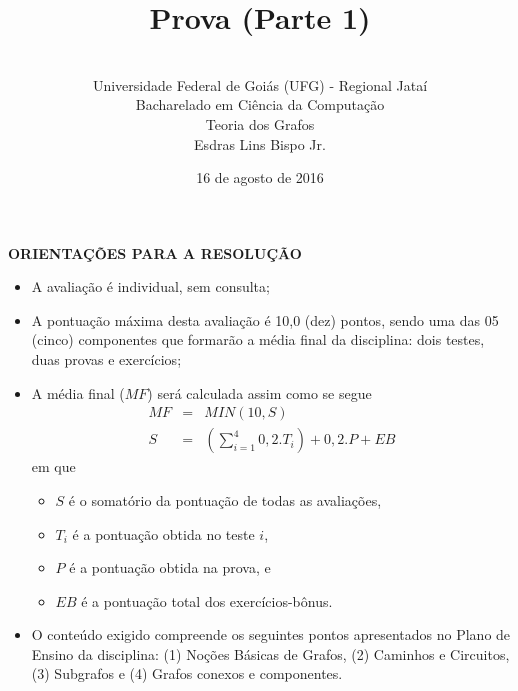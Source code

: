 \documentclass[12pt,a4paper,oneside]{article}
\author{\\Universidade Federal de Goiás (UFG) - Regional Jataí\\Bacharelado em Ciência da Computação \\Teoria dos Grafos \\Esdras Lins Bispo Jr.}
\title{\sc \huge Prova (Parte 1)}
\date{16 de agosto de 2016}
\begin{document}
\maketitle

{\bf ORIENTAÇÕES PARA A RESOLUÇÃO}

\footnotesize

\begin{itemize}
	\item A avaliação é individual, sem consulta;
	\item A pontuação máxima desta avaliação é 10,0 (dez) pontos, sendo uma das 05 (cinco) componentes que formarão a média final da disciplina: dois testes, duas provas e exercícios;
	\item A média final ($MF$) será calculada assim como se segue
	\begin{eqnarray}
		MF & = & MIN(10, S) \nonumber \\
		S & = & (\sum_{i=1}^{4} 0,2.T_i ) + 0,2.P  + EB \nonumber
	\end{eqnarray}
	em que 
	\begin{itemize}
		\item $S$ é o somatório da pontuação de todas as avaliações,
		\item $T_i$ é a pontuação obtida no teste $i$,
		\item $P$ é a pontuação obtida na prova, e
		\item $EB$ é a pontuação total dos exercícios-bônus.
	\end{itemize}
	\item O conteúdo exigido compreende os seguintes pontos apresentados no Plano de Ensino da disciplina: (1) Noções Básicas de Grafos, (2) Caminhos e Circuitos, (3) Subgrafos e (4) Grafos conexos e componentes.
\end{itemize}

\begin{center}
\end{center}

\newpage

\normalsize
\end{document}
